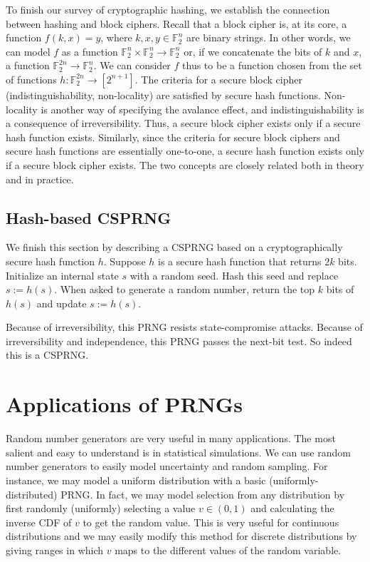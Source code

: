 \documentclass[titlepage]{article}
\theoremstyle{definition}
\begin{document}
To finish our survey of cryptographic hashing, we establish the connection between hashing and block ciphers. Recall that a block cipher is, at its core, a function $f(k,x) = y$, where $k,x,y \in \mathbb{F}_2^n$ are binary strings. In other words, we can model $f$ as a function $\mathbb{F}_2^n \times \mathbb{F}_2^n \to \mathbb{F}_2^n$ or, if we concatenate the bits of $k$ and $x$, a function $\mathbb{F}_2^{2n} \to \mathbb{F}_2^n$. We can consider $f$ thus to be a function chosen from the set of functions $h : \mathbb{F}_2^{2n} \to [2^{n+1}]$. The criteria for a secure block cipher (indistinguishability, non-locality) are satisfied by secure hash functions. Non-locality is another way of specifying the avalance effect, and indistinguishability is a consequence of irreversibility. Thus, a secure block cipher exists only if a secure hash function exists. Similarly, since the criteria for secure block ciphers and secure hash functions are essentially one-to-one, a secure hash function exists only if a secure block cipher exists. The two concepts are closely related both in theory and in practice.

\subsection{Hash-based CSPRNG}
We finish this section by describing a CSPRNG based on a cryptographically secure hash function $h$. Suppose $h$ is a secure hash function that returns $2k$ bits. Initialize an internal state $s$ with a random seed. Hash this seed and replace $s := h(s)$. When asked to generate a random number, return the top $k$ bits of $h(s)$ and update $s := h(s)$.

Because of irreversibility, this PRNG resists state-compromise attacks. Because of irreversibility and independence, this PRNG passes the next-bit test. So indeed this is a CSPRNG.

\section{Applications of PRNGs}
Random number generators are very useful in many applications. The most salient and easy to understand is in statistical simulations. We can use random number generators to easily model uncertainty and random sampling. For instance, we may model a uniform distribution with a basic (uniformly-distributed) PRNG. In fact, we may model selection from any distribution by first randomly (uniformly) selecting a value $v \in (0,1)$ and calculating the inverse CDF of $v$ to get the random value. This is very useful for continuous distributions and we may easily modify this method for discrete distributions by giving ranges in which $v$ maps to the different values of the random variable.
\end{document}
